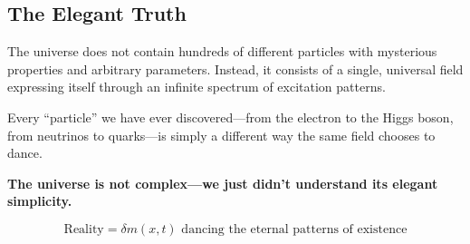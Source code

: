 \documentclass[12pt,a4paper]{article}
\newcommand{\deltam}{\delta m}
\begin{document}
	\subsection{The Elegant Truth}
	
	The universe does not contain hundreds of different particles with mysterious properties and arbitrary parameters. Instead, it consists of a single, universal field expressing itself through an infinite spectrum of excitation patterns.
	
	Every ``particle'' we have ever discovered---from the electron to the Higgs boson, from neutrinos to quarks---is simply a different way the same field chooses to dance.
	
	\textbf{The universe is not complex---we just didn't understand its elegant simplicity.}
	
	\begin{equation}
		\boxed{\text{Reality} = \deltam(x,t) \text{ dancing the eternal patterns of existence}}
		\label{eq:final_truth}
	\end{equation}
	
\end{document}
